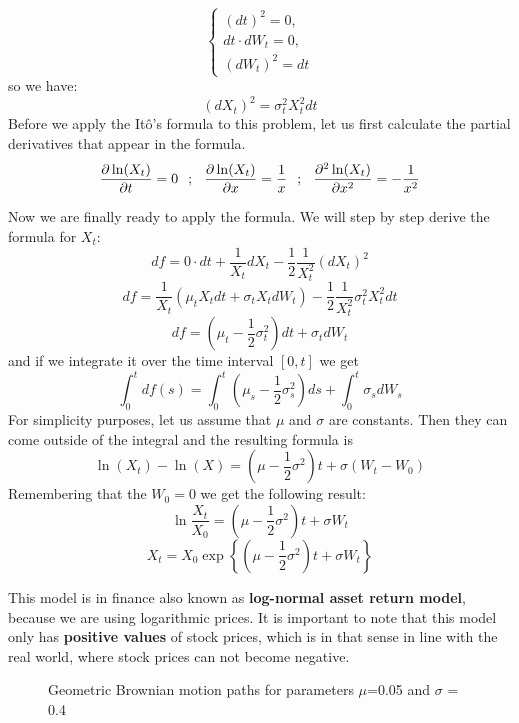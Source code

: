 \documentclass[times, utf8, diplomski]{fer}
\begin{document}
$$ \left\{ \begin{array}{c} (dt)^2 = 0, \\ dt\cdot dW_t = 0, \\ (dW_t)^2 = dt \end{array} \right. $$ so we have: $$(dX_t)^2 = \sigma_t^2X_t^2dt$$
Before we apply the It\^{o}'s formula to this problem, let us first calculate the partial derivatives that appear in the formula. 
$$
	\frac{\partial \ln(X_t)}{\partial t} = 0 \hspace{0.25cm} ; \hspace{0.25cm} \frac{\partial \ln(X_t)}{\partial x} = \frac{1}{x} \hspace{0.25cm} ; \hspace{0.25cm} \frac{\partial^2 \ln(X_t)}{\partial x^2} = -\frac{1}{x^2}
$$

Now we are finally ready to apply the formula. We will step by step derive the formula for $X_t$:
$$ df = 0\cdot dt + \frac{1}{X_t}dX_t - \frac{1}{2} \frac{1}{X_t^2}(dX_t)^2 $$
$$ df = \frac{1}{X_t} (\mu_t X_t dt + \sigma_t X_t dW_t) - \frac{1}{2}\frac{1}{X_t^2}\sigma_t^2 X_t^2 dt$$
$$ df = (\mu_t - \frac{1}{2}\sigma_t^2)dt + \sigma_t dW_t  $$
and if we integrate it over the time interval $[0,t]$ we get
$$ \int_0^t df(s) = \int_0^t (\mu_s - \frac{1}{2}\sigma_s^2) ds + \int_0^t \sigma_s dW_s $$
For simplicity purposes, let us assume that $\mu$ and $\sigma$ are constants. Then they can come outside of the integral and the resulting formula is
$$ \ln(X_t) - \ln(X) = (\mu-\frac{1}{2}\sigma^2)t + \sigma (W_t - W_0) $$
Remembering that the $W_0 = 0$ we get the following result:
$$ \ln\frac{X_t}{X_0} = (\mu-\frac{1}{2}\sigma^2)t + \sigma W_t $$
\begin{equation} \label{eqn_gbm}
	X_t = X_0\exp\left\{ (\mu-\frac{1}{2}\sigma^2)t + \sigma W_t \right\}
\end{equation}

This model is in finance also known as \textbf{log-normal asset return model}, because we are using logarithmic prices. It is important to note that this model only has \textbf{positive values} of stock prices, which is in that sense in line with the real world, where stock prices can not become negative. 

\vspace{1cm}
\begin{figure}[ht]
\centering
{}
\caption{Geometric Brownian motion paths for parameters $\mu$=0.05 and $\sigma$ = 0.4}
\label{fig:gbm_paths}
\end{figure}
\end{document}

